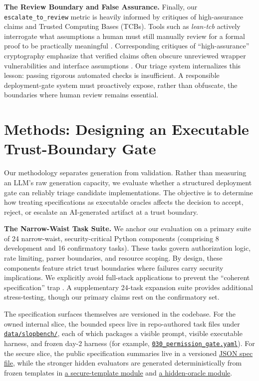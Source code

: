\documentclass[11pt]{article}
\newcommand{\repoblob}[2]{\href{https://github.com/davidkimai/sps_evals/blob/main/#1}{\texttt{#2}}}
\newcommand{\repotree}[2]{\href{https://github.com/davidkimai/sps_evals/tree/main/#1}{\texttt{#2}}}
\begin{document}
\textbf{The Review Boundary and False Assurance.}
Finally, our \texttt{escalate\_to\_review} metric is heavily informed by critiques of high-assurance claims and Trusted Computing Bases (TCBs). Tools such as \textit{lean-tcb} actively interrogate what assumptions a human must still manually review for a formal proof to be practically meaningful \cite{OathTech2026LeanTCB}. Corresponding critiques of ``high-assurance'' cryptography emphasize that verified claims often obscure unreviewed wrapper vulnerabilities and interface assumptions \cite{Symbolic2026HighAssurance}. Our triage system internalizes this lesson: passing rigorous automated checks is insufficient. A responsible deployment-gate system must proactively expose, rather than obfuscate, the boundaries where human review remains essential.

\section{Methods: Designing an Executable Trust-Boundary Gate}

Our methodology separates generation from validation. Rather than measuring an LLM's raw generation capacity, we evaluate whether a structured deployment gate can reliably triage candidate implementations. The objective is to determine how treating specifications as executable oracles affects the decision to accept, reject, or escalate an AI-generated artifact at a trust boundary.

\textbf{The Narrow-Waist Task Suite.}
We anchor our evaluation on a primary suite of 24 narrow-waist, security-critical Python components (comprising 8 development and 16 confirmatory tasks). These tasks govern authorization logic, rate limiting, parser boundaries, and resource scoping. By design, these components feature strict trust boundaries where failures carry security implications. We explicitly avoid full-stack applications to prevent the ``coherent specification'' trap \cite{Dodds2025Specs}. A supplementary 24-task expansion suite provides additional stress-testing, though our primary claims rest on the confirmatory set.

The specification surfaces themselves are versioned in the codebase. For the owned internal slice, the bounded specs live in repo-authored task files under \repotree{data/slopbench}{data/slopbench/}, each of which packages a visible prompt, visible executable harness, and frozen day-2 harness (for example, \repoblob{data/slopbench/030_permission_gate.yaml}{030\_permission\_gate.yaml}). For the secure slice, the public specification summaries live in a versioned \href{https://github.com/davidkimai/sps_evals/blob/main/data/vericoding_visible_secure_specs.json}{JSON spec file}, while the stronger hidden evaluators are generated deterministically from frozen templates in \href{https://github.com/davidkimai/sps_evals/blob/main/src/specoracle/vericoding/security_checks.py}{a secure-template module} and \href{https://github.com/davidkimai/sps_evals/blob/main/src/specoracle/vericoding/hidden_oracles.py}{a hidden-oracle module}.
\end{document}

